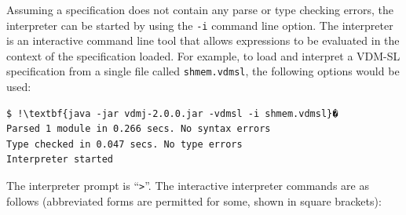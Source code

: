 \documentclass{overturerep}
\begin{document}
{Assuming a specification does not contain any parse or type checking errors, the interpreter can be
started by using the \texttt{-i} command line option.
The interpreter is an interactive command line tool that allows expressions to be evaluated in the
context of the specification loaded. For example, to load and interpret a
VDM-SL specification from a single file called \texttt{shmem.vdmsl},
the following options would be used:

\begin{lstlisting}
$ !\textbf{java -jar vdmj-2.0.0.jar -vdmsl -i shmem.vdmsl}�
Parsed 1 module in 0.266 secs. No syntax errors
Type checked in 0.047 secs. No type errors
Interpreter started
\end{lstlisting}

The interpreter prompt is ``\texttt{>}''. The 
interactive interpreter commands are as follows (abbreviated forms are
permitted for some, shown in square brackets): 

}
\end{document}

